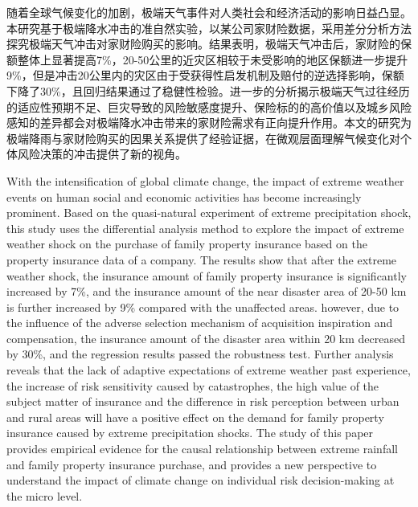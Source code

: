 \begin{cabstract}
    随着全球气候变化的加剧，极端天气事件对人类社会和经济活动的影响日益凸显。本研究基于极端降水冲击的准自然实验，以某公司家财险数据，采用差分分析方法探究极端天气冲击对家财险购买的影响。结果表明，极端天气冲击后，家财险的保额整体上显著提高7\%，20-50公里的近灾区相较于未受影响的地区保额进一步提升9\%，但是冲击20公里内的灾区由于受获得性启发机制及赔付的逆选择影响，保额下降了30\%，且回归结果通过了稳健性检验。进一步的分析揭示极端天气过往经历的适应性预期不足、巨灾导致的风险敏感度提升、保险标的的高价值以及城乡风险感知的差异都会对极端降水冲击带来的家财险需求有正向提升作用。本文的研究为极端降雨与家财险购买的因果关系提供了经验证据，在微观层面理解气候变化对个体风险决策的冲击提供了新的视角。
\end{cabstract}
\begin{eabstract}
    With the intensification of global climate change, the impact of extreme weather events on human social and economic activities has become increasingly prominent. Based on the quasi-natural experiment of extreme precipitation shock, this study uses the differential analysis method to explore the impact of extreme weather shock on the purchase of family property insurance based on the property insurance data of a company. The results show that after the extreme weather shock, the insurance amount of family property insurance is significantly increased by 7\%, and the insurance amount of the near disaster area of 20-50 km is further increased by 9\% compared with the unaffected areas. however, due to the influence of the adverse selection mechanism of acquisition inspiration and compensation, the insurance amount of the disaster area within 20 km decreased by 30\%, and the regression results passed the robustness test. Further analysis reveals that the lack of adaptive expectations of extreme weather past experience, the increase of risk sensitivity caused by catastrophes, the high value of the subject matter of insurance and the difference in risk perception between urban and rural areas will have a positive effect on the demand for family property insurance caused by extreme precipitation shocks. The study of this paper provides empirical evidence for the causal relationship between extreme rainfall and family property insurance purchase, and provides a new perspective to understand the impact of climate change on individual risk decision-making at the micro level.
\end{eabstract}
